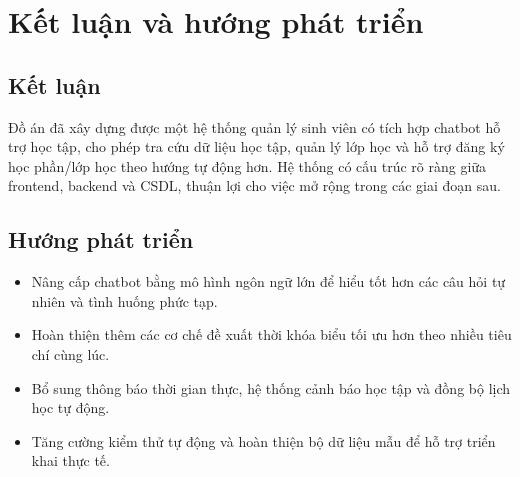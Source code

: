 \documentclass[12pt,a4paper]{report}
\begin{document}
\section{Kết luận và hướng phát triển}
\subsection{Kết luận}
Đồ án đã xây dựng được một hệ thống quản lý sinh viên có tích hợp chatbot hỗ trợ học tập, cho phép tra cứu dữ liệu học tập, quản lý lớp học và hỗ trợ đăng ký học phần/lớp học theo hướng tự động hơn. Hệ thống có cấu trúc rõ ràng giữa frontend, backend và CSDL, thuận lợi cho việc mở rộng trong các giai đoạn sau.

\subsection{Hướng phát triển}
\begin{itemize}
    \item Nâng cấp chatbot bằng mô hình ngôn ngữ lớn để hiểu tốt hơn các câu hỏi tự nhiên và tình huống phức tạp.
    \item Hoàn thiện thêm các cơ chế đề xuất thời khóa biểu tối ưu hơn theo nhiều tiêu chí cùng lúc.
    \item Bổ sung thông báo thời gian thực, hệ thống cảnh báo học tập và đồng bộ lịch học tự động.
    \item Tăng cường kiểm thử tự động và hoàn thiện bộ dữ liệu mẫu để hỗ trợ triển khai thực tế.
\end{itemize}
\end{document}
